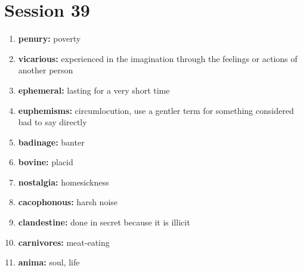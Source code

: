 \documentclass{article}
\begin{document}
\section{Session 39}
\begin{enumerate}
    \item \textbf{penury: }{poverty}
    \item \textbf{vicarious: }{experienced in the imagination through the feelings or actions of another person}
    \item \textbf{ephemeral: }{lasting for a very short time}
    \item \textbf{euphemisms: }{circumlocution, use a gentler term for something considered bad to say directly}
    \item \textbf{badinage: }{banter}
    \item \textbf{bovine: }{placid}
    \item \textbf{nostalgia: }{homesickness}
    \item \textbf{cacophonous: }{harsh noise}
    \item \textbf{clandestine: }{done in secret because it is illicit}
    \item \textbf{carnivores: }{meat-eating}
    \item \textbf{anima: }{soul, life}
    
\end{enumerate}
\end{document}
